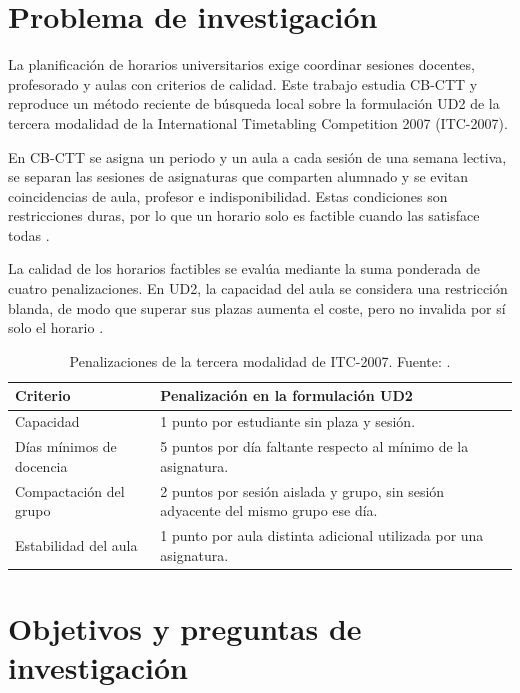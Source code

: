 \documentclass[journal]{IEEEtran}
\begin{document}

\section{Problema de investigación}

La planificación de horarios universitarios exige coordinar sesiones docentes, profesorado y aulas con criterios de calidad. Este trabajo estudia CB-CTT y reproduce un método reciente de búsqueda local sobre la formulación UD2 de la tercera modalidad de la International Timetabling Competition 2007 (ITC-2007).


En CB-CTT se asigna un periodo y un aula a cada sesión de una semana lectiva, se separan las sesiones de asignaturas que comparten alumnado y se evitan coincidencias de aula, profesor e indisponibilidad. Estas condiciones son restricciones duras, por lo que un horario solo es factible cuando las satisface todas \cite{ref1}.


La calidad de los horarios factibles se evalúa mediante la suma ponderada de cuatro penalizaciones. En UD2, la capacidad del aula se considera una restricción blanda, de modo que superar sus plazas aumenta el coste, pero no invalida por sí solo el horario \cite{ref1}.


\begin{table}[!t]
\caption{Penalizaciones de la tercera modalidad de ITC-2007. Fuente: \cite{ref1}.}
\label{tab:penalizaciones}
\centering
\footnotesize
\begin{tabular}{p{} p{}}
\toprule
\textbf{Criterio} & \textbf{Penalización en la formulación UD2}\\
\midrule
Capacidad & 1 punto por estudiante sin plaza y sesión.\\
Días mínimos de docencia & 5 puntos por día faltante respecto al mínimo de la asignatura.\\
Compactación del grupo & 2 puntos por sesión aislada y grupo, sin sesión adyacente del mismo grupo ese día.\\
Estabilidad del aula & 1 punto por aula distinta adicional utilizada por una asignatura.\\
\bottomrule
\end{tabular}
\end{table}

\section{Objetivos y preguntas de investigación}
\end{document}
